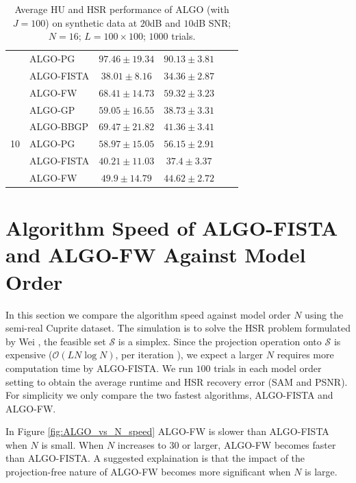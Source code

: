 \begin{table}[h]
\begin{adjustbox}{max width=\textwidth}
\begin{tabular}{|c|l|c|c|c|c|}
                    & ALGO-PG                    & $97.46    \pm 19.34$  & $90.13    \pm 3.81$ \tabularnewline
                    & ALGO-FISTA                 & $38.01    \pm 8.16$   & $34.36    \pm 2.87$ \tabularnewline
                    & ALGO-FW                    & $68.41    \pm 14.73$  & $59.32    \pm 3.23$ \tabularnewline \cline{1-4}
\multirow{5}{*}{10} & ALGO-GP                    & $59.05    \pm 16.55$  & $38.73    \pm 3.31$ \tabularnewline
                    & ALGO-BBGP                  & $69.47    \pm 21.82$  & $41.36    \pm 3.41$ \tabularnewline
                    & ALGO-PG                    & $58.97    \pm 15.05$  & $56.15    \pm 2.91$ \tabularnewline
                    & ALGO-FISTA                 & $40.21    \pm 11.03$  & $37.4     \pm 3.37$ \tabularnewline
                    & ALGO-FW                    & $49.9     \pm 14.79$  & $44.62    \pm 2.72$ \tabularnewline \cline{1-4}
\end{tabular}
\end{adjustbox}
\caption{Average HU and HSR performance of ALGO (with $J=100$) on synthetic
         data at $20$dB and $10$dB SNR; $N = 16$; $L = 100 \times 100$; $1000$
         trials.}
\label{table:results_full_MO16_SNR2010dB_J100}
\end{table}

\clearpage

\section{Algorithm Speed of ALGO-FISTA and ALGO-FW Against Model Order}
In this section we compare the algorithm speed against model order $N$ using
the semi-real Cuprite dataset.
The simulation is to solve the HSR problem formulated by Wei \etal, \ie the
feasible set $\mathcal S$ is a simplex.
Since the projection operation onto $\mathcal S$ is expensive
($\mathcal O(LN \log N)$, per iteration
\cite{SIMPLEX_PROJ}
), we expect a larger $N$ requires more
computation time by ALGO-FISTA.
We run $100$ trials in each model order setting to obtain the average runtime
and HSR recovery error (SAM and PSNR).
For simplicity we only compare the two fastest algorithms, \ie ALGO-FISTA and
ALGO-FW.

In Figure \ref{fig:ALGO_vs_N_speed} ALGO-FW is slower than ALGO-FISTA when $N$
is small.
When $N$ increases to $30$ or larger, ALGO-FW becomes faster than ALGO-FISTA.
A suggested explaination is that the impact of the projection-free nature of
ALGO-FW becomes more significant when $N$ is large.

